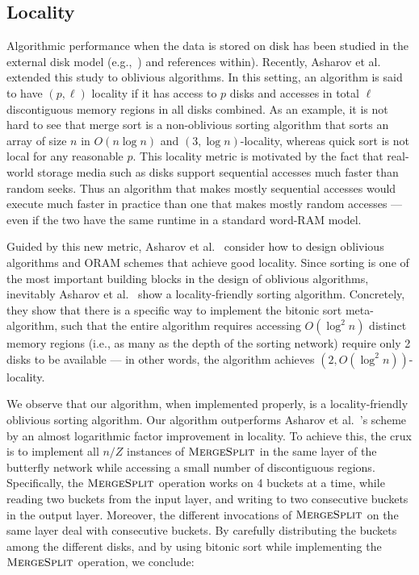 \subsection{Locality}
\label{sec:locality}
Algorithmic performance when the data is stored on disk has been studied in the external disk model (e.g.,~\cite{RuemmlerW94,ArgeFGV97,Vitter01,Vitter06}) and references within). Recently, Asharov et al.~\cite{AsharovCNPRS19} extended this study to oblivious algorithms. In this setting, an algorithm 
is said to have $(p, \ell)$ locality if it has access 
to $p$ disks and 
accesses in total $\ell$ discontiguous memory regions in all disks combined. As an example, it is not hard to see that merge sort is a non-oblivious sorting algorithm that sorts an array of size $n$ in $O(n \log n)$ and $(3,\log n)$-locality, whereas quick sort  is not local for any reasonable $p$. 
This locality metric is motivated by the fact that real-world storage
media such as disks support sequential accesses
much faster than random seeks. Thus an algorithm that 
makes mostly sequential accesses would execute much faster in practice than one that  
makes mostly random accesses --- even if the two have the same runtime in a standard
word-RAM model. 

Guided by this new metric, Asharov et al.~\cite{AsharovCNPRS19} consider how to design oblivious algorithms and ORAM schemes that achieve good locality. 
Since sorting is one of the most important
building blocks in the 
design of oblivious algorithms, 
inevitably Asharov et al.~\cite{AsharovCNPRS19}
show a locality-friendly sorting algorithm.
Concretely, they show that there is a specific way to implement
the bitonic sort meta-algorithm,
such that the entire algorithm requires accessing 
$O(\log^2 n)$ distinct memory regions (i.e., as many as the depth of the sorting network) 
require only 2 disks to be available --- in other words,
the algorithm achieves $(2, O(\log^2 n))$-locality.

We observe that our algorithm, when implemented properly, is a locality-friendly oblivious sorting algorithm. 
Our algorithm 
outperforms Asharov et al.~\cite{AsharovCNPRS19}'s  scheme 
by an almost logarithmic 
factor improvement in locality. %
To achieve this, the crux is to implement all $n/Z$ instances of 
$\textsc{MergeSplit}$ in the same layer of the butterfly network 
while accessing a small number of discontiguous regions. Specifically, the $\textsc{MergeSplit}$ operation works on 4 buckets at a time, while reading two buckets from the input layer, and writing to two consecutive buckets in the output layer. Moreover, the different invocations of $\textsc{MergeSplit}$ on the same layer deal with consecutive buckets. By carefully distributing the buckets among the different disks, and by using bitonic sort while implementing the $\textsc{MergeSplit}$ operation, we conclude:


